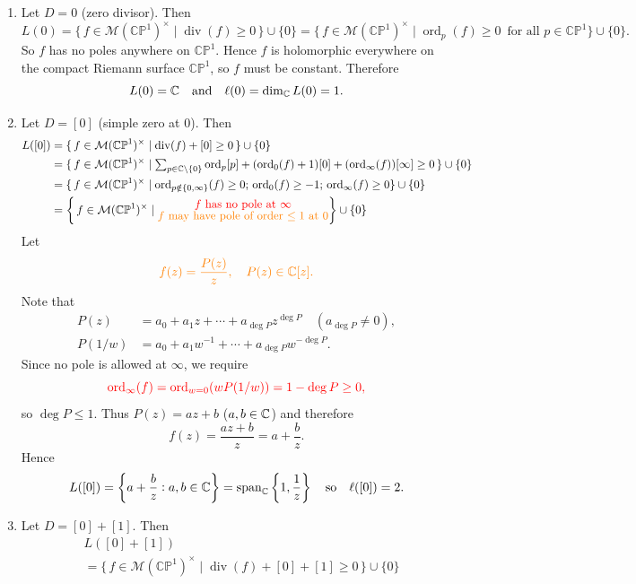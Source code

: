 \documentclass[11pt,openany]{article}
\newcommand{\ord}{\operatorname{ord}}
\newcommand{\CP}{\mathbb{CP}}
\begin{document}
\begin{example}
\; \begin{enumerate}[(1)]
	\item {\color{blue} Let $D=0$ (zero divisor).} Then \[
	L(0)=\{\,f\in\mathcal M(\mathbb{CP}^1)^\times\mid \operatorname{div}(f)\ge 0\,\}\cup\{0\}=\{\,f\in\mathcal M(\mathbb{CP}^1)^\times\mid \ord_p(f)\ge 0\,\text{ for all $p\in \CP^1$}\}\cup\{0\}.
	\] So $f$ has no poles anywhere on $\mathbb{CP}^1$. Hence $f$ is holomorphic everywhere on the compact Riemann surface $\mathbb{CP}^1$, so $f$ must be constant. Therefore
	\[
	L(0)=\mathbb C\quad\text{and}\quad\ell(0)=\dim_{\mathbb{C}} L(0)=1.
	\]
	\item {\color{blue} Let $D=[0]$ (simple zero at $0$).} Then \begin{align*}
	L([0])&=\{\,f\in\mathcal M(\mathbb{CP}^1)^\times\mid \operatorname{div}(f)+[0]\ge 0\,\}\cup\{0\}\\
	&=\{\,f\in\mathcal M(\mathbb{CP}^1)^\times\mid \textstyle\sum_{p\in\C\setminus\{0\}}\ord_p[p]+(\ord_0(f)+1)[0]+(\ord_\infty(f))[\infty]\ge 0\,\}\cup\{0\}\\
	&=\{\,f\in\mathcal M(\mathbb{CP}^1)^\times\mid \ord_{p\notin\{0,\infty\}}(f)\geq 0; \,\ord_{0}(f)\geq -1; \,\ord_{\infty}(f)\geq 0\}\cup\{0\} \\
	&=\set{\,f\in\mathcal M(\mathbb{CP}^1)^\times\mid \substack{\text{\normalsize\color{red} $f$ has no pole at $\infty$}\\ \text{\normalsize\color{orange} $f$ may have pole of order $\leq 1$ at $0$}}}\cup\{0\}
	\end{align*}
	Let \[
	\color{orange}f(z)=\frac{P(z)}{z},\quad P(z)\in\mathbb{C}[z].
	\] Note that \begin{align*}
		P(z)&=a_0+a_1z+\cdots+a_{\deg P}z^{\deg P}\quad(a_{\deg P}\neq 0),\\
		P(1/w)&=a_0+a_1w^{-1}+\cdots+a_{\deg P}w^{-\deg P}.
	\end{align*}
	Since no pole is allowed at $\infty$, we require
	\[
	\color{red}\ord_\infty(f)=\ord_{w=0}(wP(1/w))=1-\deg P\ge 0,
	\]
	so $\deg P\le 1$. Thus $P(z)=az+b$ ($a,b\in\mathbb{C}$)
	and therefore \[
	f(z)=\frac{az+b}{z}=a+\frac{b}{z}.
	\]
	Hence
	\[
	L([0])=\set{a+\frac{b}{z}:a,b\in\mathbb{C}}=\operatorname{span}_{\mathbb{C}}\left\{1,\frac1z\right\}
	\quad\text{so}\quad
	\ell([0])=2.
	\]
	\item {\color{blue} Let $D=[0]+[1]$.} Then
	\begin{align*}
		&L([0]+[1])\\
		&=\{\,f\in\mathcal M(\mathbb{CP}^1)^\times\mid \operatorname{div}(f)+[0]+[1]\ge 0\,\}\cup\{0\}\\

\end{align*}
\end{enumerate}
\end{example}
\end{document}

